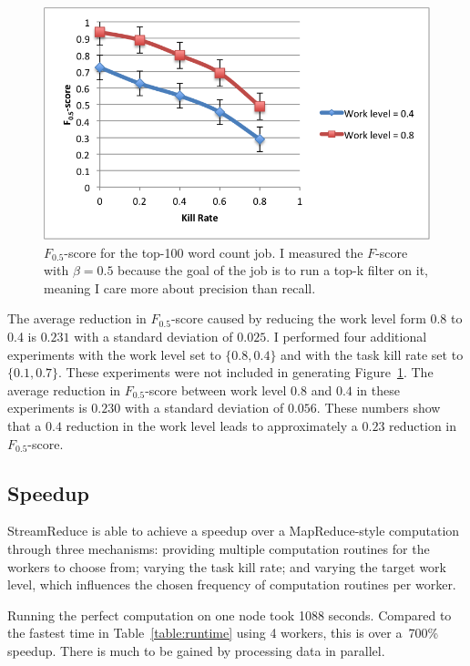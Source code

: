 \documentclass[12pt,twocolumn]{article}
\begin{document}
\begin{figure}
\includegraphics[width=\linewidth]{f-score.png}
\caption{$F_{0.5}$-score for the top-100 word count job. I measured the $F$-score with
$\beta=0.5$ because the goal of the job is to run a top-k filter on it, meaning I care more
about precision than recall.}
\label{fig:fscore}
\end{figure}

The average reduction in $F_{0.5}$-score caused by reducing the work level form 0.8 to 0.4
is
$0.231$ with a standard deviation of $0.025$. I performed four additional experiments with
the
work level set to $\{0.8,0.4\}$ and with the task kill rate set to $\{0.1,0.7\}$. These
experiments were
not included in generating Figure~\ref{fig:fscore}. The average reduction in $F_{0.5}$-score
between
work level $0.8$ and $0.4$ in these experiments is $0.230$ with a standard deviation of
$0.056$. These numbers show that a $0.4$ reduction in the work level leads to
approximately a
$0.23$ reduction in $F_{0.5}$-score.

\subsection{Speedup}
StreamReduce is able to achieve a speedup over a MapReduce-style computation through
three mechanisms:
providing multiple computation routines for the workers to choose from; varying the task kill
rate; and varying the target work level, which influences the chosen frequency of
computation
routines per worker.

Running the perfect computation on one node took 1088 seconds. Compared to the fastest time
in Table~\ref{table:runtime} using 4 workers, this is over a~700\% speedup. There is much to
be gained by processing data in parallel.
\end{document}
